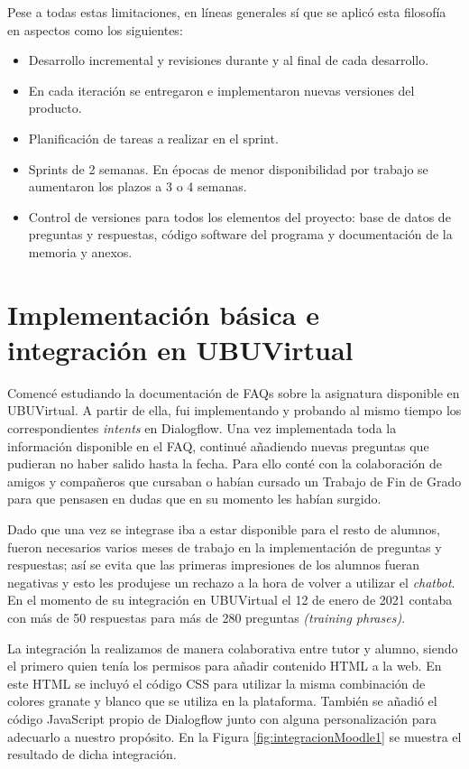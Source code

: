 Pese a todas estas limitaciones, en líneas generales sí que se aplicó esta filosofía en aspectos como los siguientes:
\begin{itemize}
	\tightlist
	\item
	Desarrollo incremental y revisiones durante y al final de cada desarrollo.
	\item 
	En cada iteración se entregaron e implementaron nuevas versiones del producto.
	\item 
	Planificación de tareas a realizar en el sprint.
	\item 
	Sprints de 2 semanas. En épocas de menor disponibilidad por trabajo se aumentaron los plazos a 3 o 4 semanas.
	\item
	Control de versiones para todos los elementos del proyecto: base de datos de preguntas y respuestas, código software del programa y documentación de la memoria y anexos.
\end{itemize}

\newpage

\section{Implementación básica e integración en UBUVirtual}

Comencé estudiando la documentación de FAQs sobre la asignatura disponible en UBUVirtual. A partir de ella, fui implementando y probando al mismo tiempo los correspondientes \textit{intents} en Dialogflow. Una vez implementada toda la información disponible en el FAQ, continué añadiendo nuevas preguntas que pudieran no haber salido hasta la fecha. Para ello conté con la colaboración de amigos y compañeros que cursaban o habían cursado un Trabajo de Fin de Grado para que pensasen en dudas que en su momento les habían surgido.

Dado que una vez se integrase iba a estar disponible para el resto de alumnos, fueron necesarios varios meses de trabajo en la implementación de preguntas y respuestas; así se evita que las primeras impresiones de los alumnos fueran negativas y esto les produjese un rechazo a la hora de volver a utilizar el \textit{chatbot}. En el momento de su integración en UBUVirtual el 12 de enero de 2021 contaba con más de 50 respuestas  para más de 280 preguntas \textit{(training phrases)}.

La integración la realizamos de manera colaborativa entre tutor y alumno, siendo el primero quien tenía los permisos para añadir contenido HTML a la web. En este HTML se incluyó el código CSS para utilizar la misma combinación de colores granate y blanco que se utiliza en la plataforma. También se añadió el código JavaScript propio de Dialogflow junto con alguna personalización para adecuarlo a nuestro propósito. En la Figura \ref{fig:integracionMoodle1} se muestra el resultado de dicha integración.

